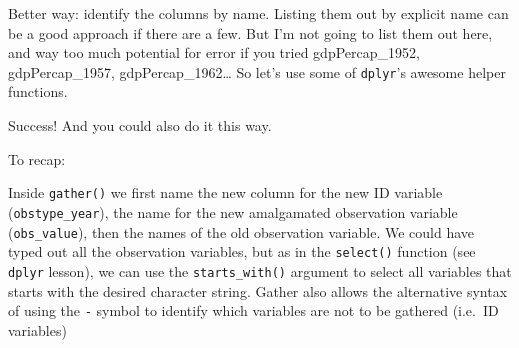 \documentclass[]{book}
\newenvironment{Shaded}{\begin{snugshade}}{\end{snugshade}}
\newcommand{\KeywordTok}[1]{\textcolor[rgb]{0.13,0.29,0.53}{\textbf{{#1}}}}
\newcommand{\DataTypeTok}[1]{\textcolor[rgb]{0.13,0.29,0.53}{{#1}}}
\newcommand{\StringTok}[1]{\textcolor[rgb]{0.31,0.60,0.02}{{#1}}}
\newcommand{\NormalTok}[1]{{#1}}
\theoremstyle{definition}
\theoremstyle{definition}
\theoremstyle{definition}
\theoremstyle{remark}
\begin{document}
Better way: identify the columns by name. Listing them out by explicit
name can be a good approach if there are a few. But I'm not going to
list them out here, and way too much potential for error if you tried
gdpPercap\_1952, gdpPercap\_1957, gdpPercap\_1962\ldots{} So let's use
some of \texttt{dplyr}'s awesome helper functions.

\begin{Shaded}
\end{Shaded}

Success! And you could also do it this way.

\begin{Shaded}
\end{Shaded}

To recap:

Inside \texttt{gather()} we first name the new column for the new ID
variable (\texttt{obstype\_year}), the name for the new amalgamated
observation variable (\texttt{obs\_value}), then the names of the old
observation variable. We could have typed out all the observation
variables, but as in the \texttt{select()} function (see \texttt{dplyr}
lesson), we can use the \texttt{starts\_with()} argument to select all
variables that starts with the desired character string. Gather also
allows the alternative syntax of using the \texttt{-} symbol to identify
which variables are not to be gathered (i.e.~ID variables)
\end{document}

